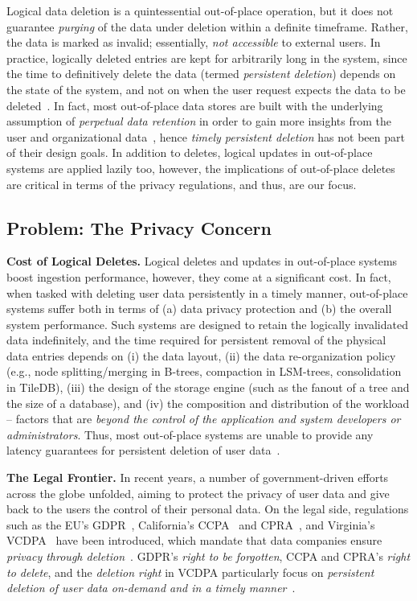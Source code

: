 \documentclass[11pt,dvipdfmx]{article}
\newcommand\Paragraph[1]{\vspace{0.02in}  \noindent \textbf{#1.}}
\begin{document}
Logical data deletion is a quintessential out-of-place operation, but it does not guarantee 
\emph{purging} of the data under deletion within a definite timeframe. Rather, the data is marked as
invalid; essentially, \emph{not accessible} to external users. In practice, logically 
deleted entries are kept for arbitrarily long in the system, since the time to definitively 
delete the data (termed \emph{persistent deletion}) depends on the state of the system, 
and not on when the user request expects the data to be deleted~\cite{Sarkar2020}.
In fact, most out-of-place data stores are built with the underlying assumption of 
\textit{perpetual data retention} in order to gain more insights from the user and 
organizational data~\cite{Whittaker2019}, hence \emph{timely persistent deletion} has not
been part of their design goals. In addition to deletes, logical updates in out-of-place 
systems are applied lazily too, however, the implications of out-of-place deletes are 
critical in terms of the privacy regulations, and thus, are our focus. 

\subsection{Problem: The Privacy Concern}
\Paragraph{Cost of Logical Deletes} Logical deletes and updates in out-of-place systems boost ingestion performance, however, they come at a significant cost.  
In fact, when tasked with deleting user data persistently in a timely manner, out-of-place systems suffer both in terms of (a) data privacy protection and (b) the overall system performance. 
Such systems are designed to retain the logically invalidated data indefinitely, and the time required for persistent removal of the physical data entries depends on (i) the data layout, (ii) the data re-organization policy (e.g., node splitting/merging in B-trees, compaction in LSM-trees, consolidation in TileDB), (iii) the design of the storage engine (such as the fanout of a tree and the size of a database), and (iv) the composition and distribution of the workload -- factors that are \textit{beyond the control of the application and system developers or administrators}. 
Thus, most out-of-place systems are unable to provide any latency guarantees for persistent deletion of user data~\cite{Sarkar2020}. 


\Paragraph{The Legal Frontier}
In recent years, a number of government-driven efforts across the globe unfolded, 
aiming to protect the privacy of user data and give back to the users the control of their 
personal data. On the legal side, regulations such as the EU's GDPR~\cite{GDPR}, California's 
CCPA~\cite{CCPA2018} and CPRA~\cite{CPRA}, and Virginia's 
VCDPA~\cite{VCPDA} have been introduced, which mandate that data companies ensure \textit{privacy through deletion}~\cite{Shastri2019,Shastri2021}. 
GDPR's \textit{right to be forgotten}, CCPA and CPRA's \textit{right to delete}, and the \textit{deletion right} in VCDPA particularly focus on \textit{persistent deletion of user data on-demand and in a timely manner}~\cite{Ambrose2013,Deshpande2018,Goddard2017,Jones2012,Sarkar2018,Shastri2019,Schwarzkopf2019,Tsesis2014}. 
\end{document}
